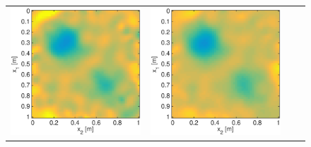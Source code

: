 \documentclass{iopart}
\begin{document}
\begin{figure}
\centering
\begin{tabular}{cccc}
\includegraphics[scale=.2]{./figs/2D_exp3_f}&
\includegraphics[scale=.2]{./figs/2D_exp3_g}&

\end{tabular}
\end{figure}
\end{document}
